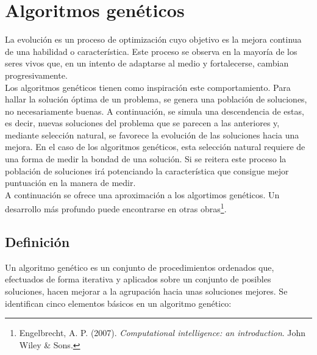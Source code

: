 \section{Algoritmos gen\'eticos}\label{sec:genetico}
		La evoluci\'on es un proceso de optimizaci\'on cuyo objetivo es la mejora continua de una habilidad o caracter\'istica. Este proceso se observa en la mayor\'ia de los seres vivos que, en un intento de adaptarse al medio y fortalecerse, cambian progresivamente.\\
		
		Los algoritmos gen\'eticos tienen como inspiraci\'on este comportamiento. Para hallar la soluci\'on \'optima de un problema, se genera una poblaci\'on de soluciones, no necesariamente buenas. A continuaci\'on, se simula una descendencia de estas, es decir, nuevas soluciones del problema que se parecen a las anteriores y, mediante selecci\'on natural, se favorece la evoluci\'on de las soluciones hacia una mejora. En el caso de los algoritmos gen\'eticos, esta selecci\'on natural requiere de una forma de medir la bondad de una soluci\'on. Si se reitera este proceso la poblaci\'on de soluciones ir\'a potenciando la caracter\'istica que consigue mejor puntuaci\'on en la manera de medir.\\ 
		
		A continuaci\'on se ofrece una aproximaci\'on a los algortimos gen\'eticos. Un desarrollo m\'as profundo puede encontrarse en otras obras\footnote{Engelbrecht, A. P. (2007). \textit{Computational intelligence: an introduction}. John Wiley \& Sons.  }.
		
		\subsection{Definici\'on}
		Un algoritmo gen\'etico es un conjunto de procedimientos ordenados que, efectuados de forma iterativa y aplicados sobre un conjunto de posibles soluciones, hacen mejorar a la agrupaci\'on hacia unas soluciones mejores. Se identifican cinco elementos b\'asicos en un algoritmo gen\'etico:\\
		
